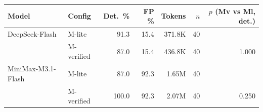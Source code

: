 \begin{tabular}{llrrrrr}
\toprule
Model & Config & Det.\ \% & FP \% & Tokens & $n$ & $p$ (Mv vs Ml, det.) \\
\midrule
DeepSeek-Flash & M-lite & 91.3 & 15.4 & 371.8K & 40 & \\
 & M-verified & 87.0 & 15.4 & 436.8K & 40 & 1.000 \\
\addlinespace
MiniMax-M3.1-Flash & M-lite & 87.0 & 92.3 & 1.65M & 40 & \\
 & M-verified & 100.0 & 92.3 & 2.07M & 40 & 0.250 \\
\bottomrule
\end{tabular}
